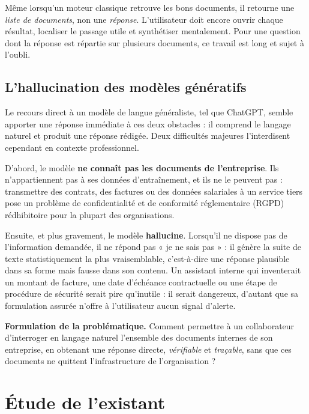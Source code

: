 Même lorsqu'un moteur classique retrouve les bons documents, il retourne une
\emph{liste de documents}, non une \emph{réponse}. L'utilisateur doit encore
ouvrir chaque résultat, localiser le passage utile et synthétiser mentalement.
Pour une question dont la réponse est répartie sur plusieurs documents, ce
travail est long et sujet à l'oubli.

\subsection{L'hallucination des modèles génératifs}

Le recours direct à un modèle de langue généraliste, tel que ChatGPT, semble
apporter une réponse immédiate à ces deux obstacles : il comprend le langage
naturel et produit une réponse rédigée. Deux difficultés majeures l'interdisent
cependant en contexte professionnel.

D'abord, le modèle \textbf{ne connaît pas les documents de l'entreprise}. Ils
n'appartiennent pas à ses données d'entraînement, et ils ne le peuvent pas :
transmettre des contrats, des factures ou des données salariales à un service
tiers pose un problème de confidentialité et de conformité réglementaire
(RGPD) rédhibitoire pour la plupart des organisations.

Ensuite, et plus gravement, le modèle \textbf{hallucine}. Lorsqu'il ne dispose
pas de l'information demandée, il ne répond pas « je ne sais pas » : il génère
la suite de texte statistiquement la plus vraisemblable, c'est-à-dire une
réponse plausible dans sa forme mais fausse dans son contenu. Un assistant
interne qui inventerait un montant de facture, une date d'échéance contractuelle
ou une étape de procédure de sécurité serait pire qu'inutile : il serait
dangereux, d'autant que sa formulation assurée n'offre à l'utilisateur aucun
signal d'alerte.

\begin{encadre}
\textbf{Formulation de la problématique.} Comment permettre à un collaborateur
d'interroger en langage naturel l'ensemble des documents internes de son
entreprise, en obtenant une réponse directe, \emph{vérifiable} et
\emph{traçable}, sans que ces documents ne quittent l'infrastructure de
l'organisation ?
\end{encadre}

\section{Étude de l'existant}

